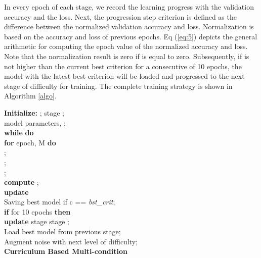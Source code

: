 \documentclass{article}
\newcommand\tab[1][12pt]{\hspace*{#1}}
\begin{document}
In every epoch of each stage, we record the learning progress with the validation accuracy and the loss. Next, the progression step criterion  is defined as the difference between the normalized validation accuracy and loss. Normalization is based on the accuracy and loss of previous epochs. Eq (\ref{eq:5}) depicts the general arithmetic for computing the  epoch value of the normalized accuracy and loss. Note that the normalization result is zero if  is equal to zero. Subsequently, if  is not higher than the current best criterion for a consecutive of 10 epochs, the model with the latest best criterion will be loaded and progressed to the next stage of difficulty for training. The 
complete training strategy is shown in Algorithm \ref{algo}.    












\begin{algorithm}[ht]
\nl\textbf{Initialize:} ; stage ;\\
\tab\tab\tab model parameters, ; \\
\nl \textbf{while}  \textbf{do} \\
    \nl \tab \textbf{for} epoch,  M \textbf{do}\\
    \nl \tab \tab ; \\
    \nl \tab \tab ;  \\
    \nl \tab \tab ; \\
    \nl \tab \tab \textbf{compute} ; \\
    \nl \tab \tab \textbf{update}  \\
    \nl \tab \tab Saving best model if c == \textit{bst\_crit}; \\
    \nl \tab \tab \textbf{if}  for 10 epochs \textbf{then} \\
    \nl \tab \tab \tab \textbf{update} stage  stage ;\\
    \nl \tab \tab \tab Load best model from previous stage;\\
    \nl \tab \tab \tab Augment noise with next level of difficulty; \\
\caption{\bf Curriculum Based Multi-condition} 
\label{algo}
\end{algorithm}
\end{document}
